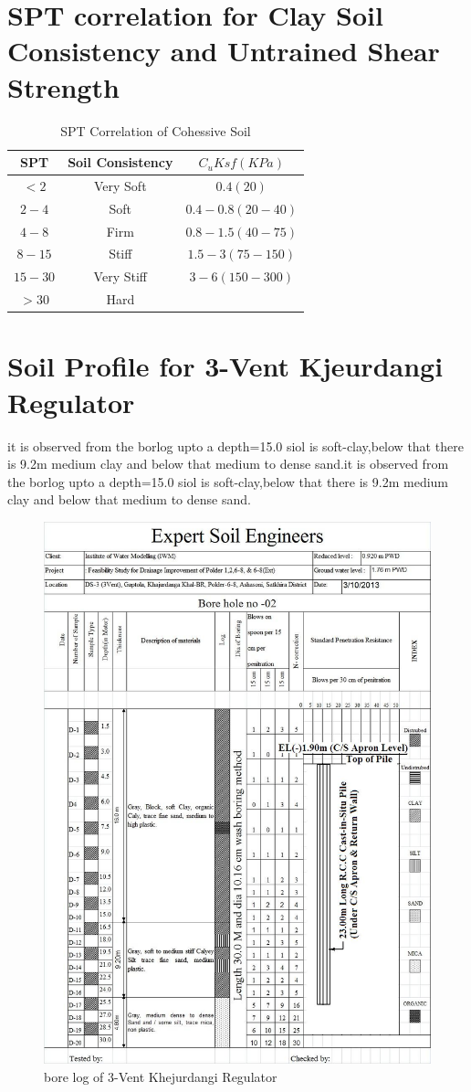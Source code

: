 \documentclass[12pt]{article}
\begin{document}
\section{SPT correlation for Clay Soil Consistency and Untrained Shear Strength }
\begin{table}[ht]
    \centering
    \begin{tabular}{|c|c|c|}
    \hline
    \textbf{SPT} & \textbf{Soil Consistency} & \textbf{$C_uKsf(KPa)$}\\
    \hline
    $<2$ & Very Soft & $0.4(20)$\\
    \hline
    $2-4$ & Soft & $0.4-0.8(20-40)$\\
    \hline
    $4-8$ & Firm & $0.8-1.5(40-75)$\\
    \hline
    $8-15$ & Stiff & $1.5-3(75-150)$\\
    \hline
    $15-30$ & Very Stiff & $3-6(150-300)$\\
    \hline
    $>30$ & Hard & \\
    \hline
    \end{tabular}
    \caption{SPT Correlation of Cohessive Soil}
    \label{tab:my_label}
\end{table}



\section{Soil Profile for 3-Vent Kjeurdangi Regulator}
it is observed from the borlog upto a depth=15.0 siol is soft-clay,below that  there is 9.2m medium clay and below that medium to dense sand.it is observed from the borlog upto a depth=15.0 siol is soft-clay,below that  there is 9.2m medium clay and below that medium to dense sand.




\begin{figure}

\includegraphics[height=0.9\linewidth]{borhole_2}
\caption{bore log of 3-Vent Khejurdangi Regulator}
\label{fig:bore-log}
\end{figure}
\clearpage
\end{document}
